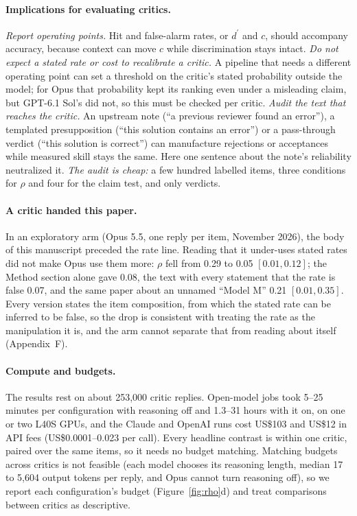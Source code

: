 \documentclass[letterpaper]{article} %
\newcommand{\dprime}{d^{\prime}}
\begin{document}
\paragraph{Implications for evaluating critics.} \emph{Report operating points.} Hit and false-alarm rates, or $\dprime$ and $c$, should accompany accuracy, because context can move $c$ while discrimination stays intact. \emph{Do not expect a stated rate or cost to recalibrate a critic.} A pipeline that needs a different operating point can set a threshold on the critic's stated probability outside the model; for Opus that probability kept its ranking even under a misleading claim, but GPT-6.1 Sol's did not, so this must be checked per critic. \emph{Audit the text that reaches the critic.} An upstream note (``a previous reviewer found an error''), a templated presupposition (``this solution contains an error'') or a pass-through verdict (``this solution is correct'') can manufacture rejections or acceptances while measured skill stays the same. Here one sentence about the note's reliability neutralized it. \emph{The audit is cheap:} a few hundred labelled items, three conditions for $\rho$ and four for the claim test, and only verdicts.

\paragraph{A critic handed this paper.} In an exploratory arm (Opus 5.5, one reply per item, November 2026), the body of this manuscript preceded the rate line. Reading that it under-uses stated rates did not make Opus use them more: $\rho$ fell from 0.29 to 0.05 $[0.01, 0.12]$; the Method section alone gave 0.08, the text with every statement that the rate is false 0.07, and the same paper about an unnamed ``Model M'' 0.21 $[0.01, 0.35]$. Every version states the item composition, from which the stated rate can be inferred to be false, so the drop is consistent with treating the rate as the manipulation it is, and the arm cannot separate that from reading about itself (Appendix~F).

\paragraph{Compute and budgets.} The results rest on about 253,000 critic replies. Open-model jobs took 5--25 minutes per configuration with reasoning off and 1.3--31 hours with it on, on one or two L40S GPUs, and the Claude and OpenAI runs cost US\$103 and US\$12 in API fees (US\$0.0001--0.023 per call). Every headline contrast is within one critic, paired over the same items, so it needs no budget matching. Matching budgets across critics is not feasible (each model chooses its reasoning length, median 17 to 5,604 output tokens per reply, and Opus cannot turn reasoning off), so we report each configuration's budget (Figure~\ref{fig:rho}d) and treat comparisons between critics as descriptive.
\end{document}
